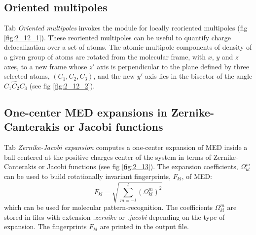 \documentclass[10pt]{article}
\begin{document}
\subsection{Oriented multipoles \label{sec:2.12}}

Tab {\it Oriented multipoles} invokes the
module for locally reoriented multipoles (fig \ref{fig:2_12_1}). These
reoriented multipoles can be useful to quantify charge delocalization over a set
of atoms. The atomic multipole components of density of a given group of atoms
are rotated from the molecular frame, with $x$, $y$ and $z$ axes, to a new frame
whose $z'$ axis is perpendicular to the plane defined by three selected atoms,
$(C_1,C_2,C_3)$, and the new $y'$ axis lies in the bisector of the angle
$\widehat{C_1C_2C_3}$ (see fig \ref{fig:2_12_2}).


\subsection{One-center MED expansions in Zernike-Canterakis or Jacobi functions \label{sec:2.13}}

Tab {\it Zernike-Jacobi expansion} computes a one-center expansion
of MED inside a ball centered at the positive charges center of the system
in terms of Zernike-Canterakis or Jacobi functions (see fig
\ref{fig:2_13}). The expansion 
coefficients, $\Omega_{kl}^m$ can be used to build
rotationally invariant fingerprints, $F_{kl}$, of MED:
% 
$$ 
F_{kl} = \sqrt{ \sum_{m=-l}^l (\Omega_{kl}^m)^2 } 
$$
%
which can be used for molecular pattern-recognition. The coefficients $\Omega_{kl}^m$ are stored in files
with extension {\it .zernike} or {\it .jacobi} depending on the type of expansion.
The fingerprints $F_{kl}$ are printed in the output file.


   
\end{document}
